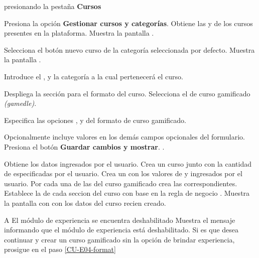 \begin{UCtrayectoria}%
   presionando la pestaña {\bf Cursos}

  \Actor Presiona la opción {\bf Gestionar cursos y categorías}.
  \Sistema Obtiene las  y 
            de los cursos presentes en la plataforma.
  \Sistema Muestra la pantalla .

  \Actor Selecciona el botón nuevo curso de la categoría seleccionada por defecto.
  \Sistema Muestra la pantalla .

  \Actor Introduce el ,  y
         la categoría a la cual pertenecerá el curso.

  \Actor Despliega la sección para el formato del curso.
  \Actor Selecciona el  de curso gamificado {\it(gamedle)}.
          \label{CU-E04-format}

  \Actor Especifica las opciones ,
          y  
         del formato de curso gamificado.  

  \Actor Opcionalmente incluye valores en los demás campos opcionales del formulario.
  \Actor Presiona el botón {\bf Guardar cambios y mostrar}.  
          \label{CU-E04-submit}.

  \Sistema Obtiene los datos ingresados por el usuario.
  \Sistema Crea un curso  junto con la cantidad de
            especificadas por el usuario.
  \Sistema Crea un  con los valores de  
           y  ingresados por el usuario.
  \Sistema Por cada una de las  del curso gamificado
           crea las  correspondientes.
  \Sistema Establece la  de cada seccion del curso con base 
           en la regla de negocio . \label{CU-E04-finish}
  \Sistema Muestra la pantalla con  con los datos del curso recien
           creado.

\end{UCtrayectoria}

\begin{UCtrayectoriaA}{A}{%
El módulo de experiencia se encuentra deshabilitado
}
  \Sistema Muestra el mensaje informando que el módulo de experiencia está 
           deshabilitado.
  \Actor Si es que desea continuar y crear un curso gamificado sin la opción
         de brindar experiencia, prosigue en el paso \ref{CU-E04-format}

\end{UCtrayectoriaA}

